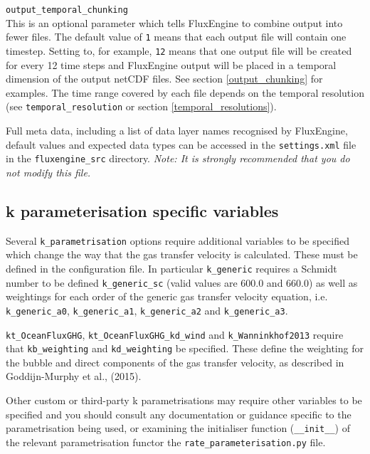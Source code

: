 \documentclass[]{scrartcl}
\newcommand{\conflistingsep}{\vspace{0.40cm}}
\begin{document}
\conflistingsep \noindent \texttt{output\_temporal\_chunking}\\
This is an optional parameter which tells FluxEngine to combine output into fewer files. The default value of \texttt{1} means that each output file will contain one timestep. Setting to, for example, \texttt{12} means that one output file will be created for every 12 time steps and FluxEngine output will be placed in a temporal dimension of the output netCDF files. See section \ref{output_chunking} for examples. The time range covered by each file depends on the temporal resolution (see \texttt{temporal\_resolution} or section \ref{temporal_resolutions}).

Full meta data, including a list of data layer names recognised by FluxEngine, default values and expected data types can be accessed in the \texttt{settings.xml} file in the \texttt{fluxengine\_src} directory. \textit{Note: It is strongly recommended that you do not modify this file.}


\subsection{k parameterisation specific variables}
Several \texttt{k\_parametrisation} options require additional variables to be specified which change the way that the gas transfer velocity is calculated. These must be defined in the configuration file. In particular \texttt{k\_generic} requires a Schmidt number to be defined \texttt{k\_generic\_sc} (valid values are $600.0$ and $660.0$) as well as weightings for each order of the generic gas transfer velocity equation, i.e. \texttt{k\_generic\_a0}, \texttt{k\_generic\_a1}, \texttt{k\_generic\_a2} and \texttt{k\_generic\_a3}.

\texttt{kt\_OceanFluxGHG}, \texttt{kt\_OceanFluxGHG\_kd\_wind} and \texttt{k\_Wanninkhof2013} require that \texttt{kb\_weighting} and \texttt{kd\_weighting} be specified. These define the weighting for the bubble and direct components of the gas transfer velocity, as described in Goddijn-Murphy et al., (2015). %

Other custom or third-party k parametrisations may require other variables to be specified and you should consult any documentation or guidance specific to the parametrisation being used, or examining the initialiser function (\texttt{\_\_init\_\_}) of the relevant parametrisation functor the \texttt{rate\_parameterisation.py} file.
\end{document}
